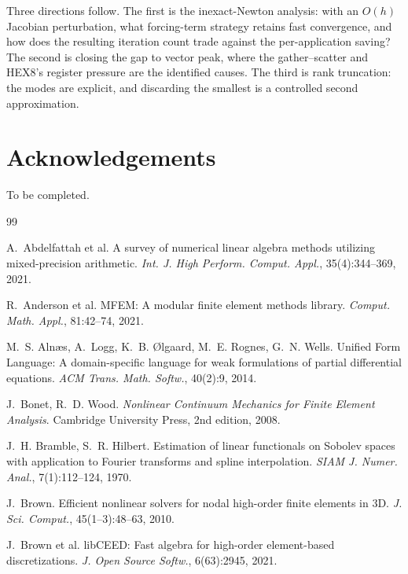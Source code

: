 \documentclass[11pt]{article}
\begin{document}
Three directions follow.  The first is the inexact-Newton analysis: with an
$O(h)$ Jacobian perturbation, what forcing-term strategy retains fast
convergence, and how does the resulting iteration count trade against the
per-application saving?  The second is closing the gap to vector peak, where the
gather--scatter and HEX8's register pressure are the identified causes.  The
third is rank truncation: the modes are explicit, and discarding the smallest is
a controlled second approximation.

\section*{Acknowledgements}

To be completed.

\begin{thebibliography}{99}

A.~Abdelfattah et al.
\newblock A survey of numerical linear algebra methods utilizing mixed-precision arithmetic.
\newblock \emph{Int. J. High Perform. Comput. Appl.}, 35(4):344--369, 2021.

R.~Anderson et al.
\newblock MFEM: A modular finite element methods library.
\newblock \emph{Comput. Math. Appl.}, 81:42--74, 2021.

M.~S. Aln{\ae}s, A.~Logg, K.~B. {\O}lgaard, M.~E. Rognes, G.~N. Wells.
\newblock Unified Form Language: A domain-specific language for weak formulations of partial differential equations.
\newblock \emph{ACM Trans. Math. Softw.}, 40(2):9, 2014.

J.~Bonet, R.~D. Wood.
\newblock \emph{Nonlinear Continuum Mechanics for Finite Element Analysis}.
\newblock Cambridge University Press, 2nd edition, 2008.

J.~H. Bramble, S.~R. Hilbert.
\newblock Estimation of linear functionals on Sobolev spaces with application to Fourier transforms and spline interpolation.
\newblock \emph{SIAM J. Numer. Anal.}, 7(1):112--124, 1970.

J.~Brown.
\newblock Efficient nonlinear solvers for nodal high-order finite elements in 3D.
\newblock \emph{J. Sci. Comput.}, 45(1--3):48--63, 2010.

J.~Brown et al.
\newblock libCEED: Fast algebra for high-order element-based discretizations.
\newblock \emph{J. Open Source Softw.}, 6(63):2945, 2021.


\end{thebibliography}
\end{document}

